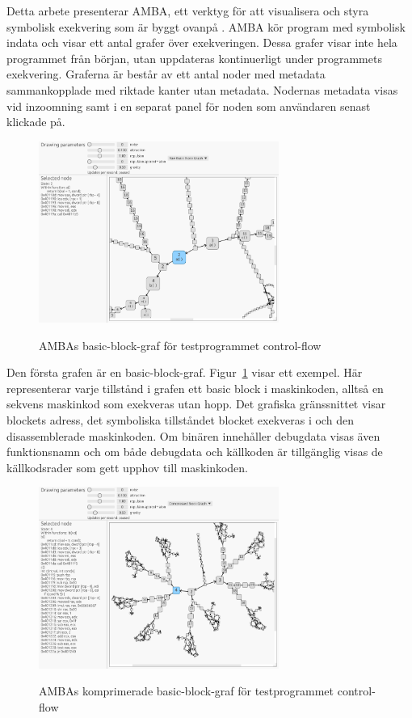 \label{chap:amba}

Detta arbete presenterar AMBA, ett verktyg för att visualisera och styra
symbolisk exekvering som är byggt ovanpå \stoe{}. AMBA kör program med symbolisk
indata och visar ett antal grafer över exekveringen. Dessa grafer visar inte
hela programmet från början, utan uppdateras kontinuerligt under programmets
exekvering. Graferna är består av ett antal noder med metadata sammankopplade
med riktade kanter utan metadata. Nodernas metadata visas vid inzoomning samt i
en separat panel för noden som användaren senast klickade på.

\begin{figure}
	\centering
	\includegraphics[width=0.7\textwidth]{figures/graph_basic_block.png}\label{fig:graf-basic}
	\caption{AMBAs basic-block-graf för testprogrammet control-flow}
\end{figure}

Den första grafen är en basic-block-graf. Figur~\ref{fig:graf-basic} visar ett
exempel. Här representerar varje tillstånd i grafen ett basic block i
maskinkoden, alltså en sekvens maskinkod som exekveras utan hopp. Det grafiska
gränssnittet visar blockets adress, det symboliska tillståndet blocket exekveras
i och den disassemblerade maskinkoden. Om binären innehåller debugdata visas
även funktionsnamn och om både debugdata och källkoden är tillgänglig visas de
källkodsrader som gett upphov till maskinkoden.

\begin{figure}
	\centering
	\includegraphics[width=0.7\textwidth]{figures/graph_block_compressed.png}\label{fig:graf-compressed}
	\caption{AMBAs komprimerade basic-block-graf för testprogrammet control-flow}
\end{figure}

